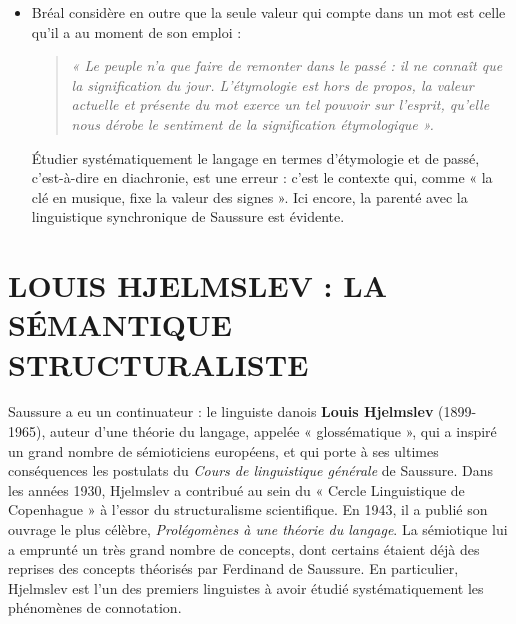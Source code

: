 \begin{itemize}
\begin{quote}
\end{quote}
\item Bréal considère en outre que la seule valeur qui compte dans un mot est celle qu’il a au moment de son emploi :
\begin{quote}\small\itshape
« Le peuple n’a que faire de remonter dans le passé : il ne connaît que la signification du jour. L’étymologie est hors de propos, la valeur actuelle et présente du mot exerce un tel pouvoir sur l’esprit, qu’elle nous dérobe le sentiment de la signification étymologique ».
\end{quote}
Étudier systématiquement le langage en termes d’étymologie et de passé, c’est-à-dire en diachronie, est une erreur : c’est le contexte qui, comme « la clé en musique, fixe la valeur des signes ». Ici encore, la parenté avec la linguistique synchronique de Saussure est évidente.
\end{itemize}
\section{LOUIS HJELMSLEV : LA SÉMANTIQUE STRUCTURALISTE}
Saussure a eu un continuateur : le linguiste danois \textbf{Louis Hjelmslev} (1899-1965), auteur d’une théorie du langage, appelée « glossématique », qui a inspiré un grand nombre de sémioticiens européens, et qui porte à ses ultimes conséquences les postulats du \textit{Cours de linguistique générale} de Saussure. Dans les années 1930, Hjelmslev a contribué au sein du « Cercle Linguistique de Copenhague » à l’essor du structuralisme scientifique. En 1943, il a publié son ouvrage le plus célèbre, \textit{Prolégomènes à une théorie du langage}. La sémiotique lui a emprunté un très grand nombre de concepts, dont certains étaient déjà des reprises des concepts
 théorisés par Ferdinand de Saussure. En particulier, Hjelmslev est l’un des premiers linguistes à avoir étudié systématiquement les phénomènes de connotation.

